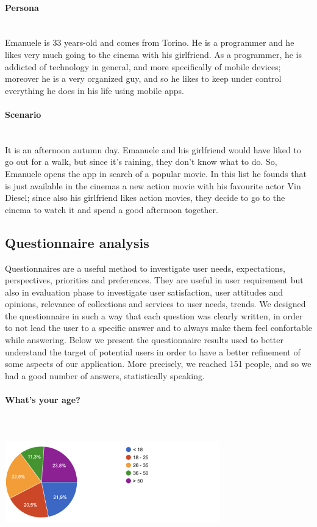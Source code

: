\documentclass[12pt, a4paper]{article}
\numberwithin{figure}{section}
\begin{document}
\paragraph{Persona}\mbox{}\\
Emanuele is 33 years-old and comes from Torino. He is a programmer and he likes
very much going to the cinema with his girlfriend.
As a programmer, he is addicted of technology in general, and more specifically of mobile
devices; moreover he is a very organized guy, and so he likes to keep under control
everything he does in his life using mobile apps.

\paragraph{Scenario}\mbox{}\\
It is an afternoon autumn day. Emanuele and his girlfriend would have liked to go
out for a walk, but since it’s raining, they don’t know what to do. So, Emanuele opens
the app in search of a popular movie. In this list he founds that is just
available in the cinemas a new action movie with his favourite actor Vin Diesel; since also his
girlfriend likes action movies, they decide to go to the cinema to watch it and spend
a good afternoon together.



\subsection{Questionnaire analysis}

Questionnaires are a useful method to investigate user needs, expectations, perspectives, priorities and preferences.
They are useful in user requirement but also in evaluation phase to investigate user satisfaction, user attitudes and opinions, relevance of collections and services to user needs, trends.
We designed the questionnaire in such a way that each question was clearly written, in order to not lead the user to a specific answer and to
always make them feel confortable while answering.
Below we present the questionnaire results used to better understand the target of potential users in order to have a better refinement of
some aspects of our application.
More precisely, we reached 151 people, and so we had a good number of answers, statistically speaking.\\

\paragraph{What's your age?}\mbox{}\\\\
\includegraphics[width=0.7\textwidth]{Images/age.png}\\
\end{document}
